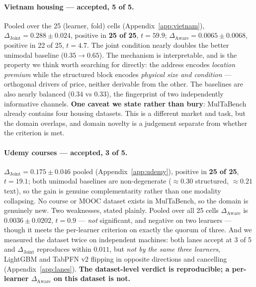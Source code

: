 \documentclass[10pt,letterpaper]{article}
\newcommand{\dj}{\Delta_{\mathrm{Joint}}}
\newcommand{\da}{\Delta_{\mathrm{Aware}}}
\begin{document}
\paragraph{Vietnam housing --- accepted, 5 of 5.} Pooled over the 25 (learner, fold) cells
(Appendix~\ref{app:vietnam}), $\dj = 0.288 \pm 0.024$, positive in \textbf{25 of 25},
$t = 59.9$; $\da = 0.0065 \pm 0.0068$, positive in 22 of 25, $t = 4.7$. The joint condition
nearly doubles the better unimodal baseline ($0.35 \rightarrow 0.65$). The mechanism is
interpretable, and is the property we think worth searching for directly: the address encodes
\emph{location premium} while the structured block encodes \emph{physical size and condition}
--- orthogonal drivers of price, neither derivable from the other. The baselines are also
nearly balanced ($0.34$ vs $0.33$), the fingerprint of two independently informative channels.
\textbf{One caveat we state rather than bury}: MulTaBench already contains four housing
datasets. This is a different market and task, but the domain overlaps, and domain novelty is a
judgement separate from whether the criterion is met.

\paragraph{Udemy courses --- accepted, 3 of 5.} $\dj = 0.175 \pm 0.046$ pooled
(Appendix~\ref{app:udemy}), positive in \textbf{25 of 25}, $t = 19.1$; both unimodal baselines
are non-degenerate ($\approx 0.30$ structured, $\approx 0.21$ text), so the gain is genuine
complementarity rather than one modality collapsing. No course or MOOC dataset exists in
MulTaBench, so the domain is genuinely new. Two weaknesses, stated plainly. Pooled over all 25
cells $\da$ is $0.0036 \pm 0.0202$, $t = 0.9$ --- \emph{not} significant, and negative on two
learners --- though it meets the per-learner criterion on exactly the quorum of three. And we
measured the dataset twice on independent machines: both lanes accept at 3 of 5 and $\dj$
reproduces within $0.011$, but \emph{not by the same three learners}, LightGBM and TabPFN v2
flipping in opposite directions and cancelling (Appendix~\ref{app:lanes}). \textbf{The
dataset-level verdict is reproducible; a per-learner $\da$ on this dataset is not.}
\end{document}
